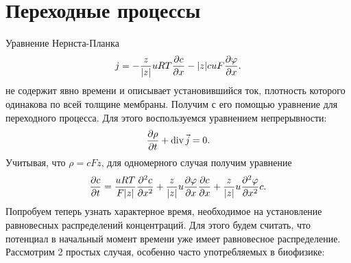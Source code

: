 \chapter{Переходные процессы}
    Уравнение Нернста-Планка
    \begin{equation}
        j = -\frac{z}{|z|}uRT\frac{\partial c}{\partial x} - |z|cuF\frac{\partial \varphi}{\partial x}.
        \label{eq:nernst-plank-2}
    \end{equation}
    не содержит явно времени и описывает установившийся ток, плотность которого
    одинакова по всей толщине мембраны. Получим с его помощью уравнение для
    переходного процесса. Для этого воспользуемся уравнением непрерывности:
    \[
        \frac{\partial \rho}{\partial t} + \mathrm{div\,}\vec{j} = 0.
    \]
    Учитывая, что \( \rho = cFz \), для одномерного случая получим уравнение
    \begin{equation}
        \frac{\partial c}{\partial t} = \frac{uRT}{F|z|}\frac{\partial^2 c}{\partial {x}^2} +
            \frac{z}{|z|}u\frac{\partial \varphi}{\partial x}\frac{\partial c}{\partial x} +
            \frac{z}{|z|}u\frac{\partial^2 \varphi}{\partial {x}^2}c.
        \label{eq:nernst-plank-2_with_time}
    \end{equation}
    Попробуем теперь узнать характерное время, необходимое на установление
    равновесных распределений концентраций. Для этого будем считать, что
    потенциал в начальный момент времени уже имеет равновесное
    распределение. Рассмотрим 2 простых случая, особенно часто употребляемых в
    биофизике:
